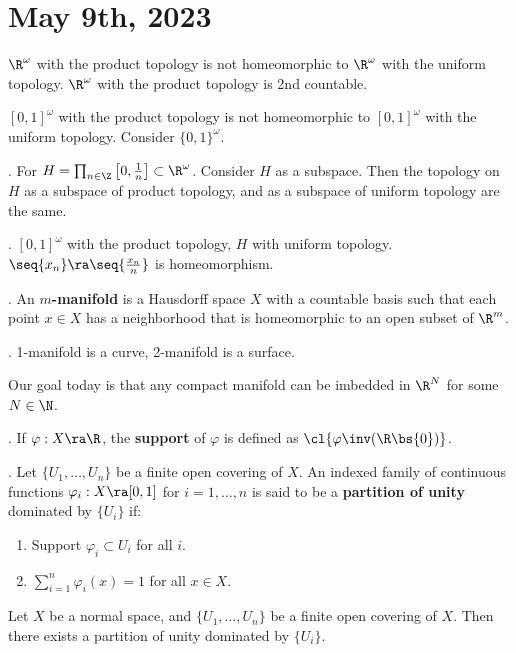 \section*{May 9th, 2023}

\rmk \(\R^\omega\) with the product topology is not homeomorphic to \(\R^\omega\) with the uniform topology. \(\R^\omega\) with the product topology is 2nd countable.

\([0, 1]^\omega\) with the product topology is not homeomorphic to \([0, 1]^\omega\) with the uniform topology. Consider \(\{0, 1\}^\omega\).

\claim. For \(H = \prod_{n \in \Z} \left[0, \frac{1}{n}\right] \subset \R^\omega\). Consider \(H\) as a subspace. Then the topology on \(H\) as a subspace of product topology, and as a subspace of uniform topology are the same.

\claim. \([0, 1]^\omega\) with the product topology, \(H\) with uniform topology. \(\seq{x_n} \ra \seq{\frac{x_n}{n}}\) is homeomorphism.


.  An \textbf{\(m\)-manifold} is a Hausdorff space \(X\) with a countable basis such that each point \(x \in X\) has a neighborhood that is homeomorphic to an open subset of \(\R^m\).

\ex. 1-manifold is a curve, 2-manifold is a surface.

Our goal today is that any compact manifold can be imbedded in \(\R^N\) for some \(N \in \N\).

.  If \(\varphi : X \ra \R\), the \textbf{support} of \(\varphi\) is defined as \(\cl{\varphi\inv(\R \bs\{0\})}\).

.  Let \(\{U_1, \dots, U_n\}\) be a finite open covering of \(X\). An indexed family of continuous functions \(\varphi_i: X \ra [0, 1]\) for \(i = 1, \dots, n\) is said to be a \textbf{partition of unity} dominated by \(\{U_i\}\) if:
\begin{enumerate}
    \item Support \(\varphi_i \subset U_i\) for all \(i\).
    \item \(\sum_{i=1}^n \varphi_i(x) = 1\) for all \(x \in X\).
\end{enumerate}

 Let \(X\) be a normal space, and \(\{U_1, \dots, U_n\}\) be a finite open covering of \(X\). Then there exists a partition of unity dominated by \(\{U_i\}\).

